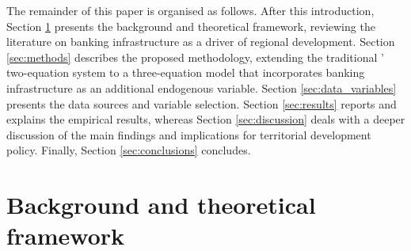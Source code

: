 \documentclass[a4paper,11pt,oneside]{article}
\begin{document}
The remainder of this paper is organised as follows. After this introduction, Section \ref{sec:background} presents the background and theoretical framework, reviewing the literature on banking infrastructure as a driver of regional development. Section \ref{sec:methods} describes the proposed methodology, extending the traditional \citeauthor{carlino1987determinants}' two-equation system to a three-equation model that incorporates banking infrastructure as an additional endogenous variable. Section \ref{sec:data_variables} presents the data sources and variable selection. Section \ref{sec:results} reports and explains the empirical results, whereas Section \ref{sec:discussion} deals with a deeper discussion of the main findings and implications for territorial development policy. Finally, Section \ref{sec:conclusions} concludes.

\color{black}

\section{Background and theoretical framework}
\label{sec:background}









\end{document}
